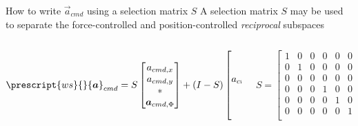\begin{frame}{How to write $\vec{a}_{cmd}$ using a selection matrix $S$}
  A selection matrix $S$ \alert{may} be used to separate the force-controlled 
  and position-controlled \emph{reciprocal} subspaces
  \begin{columns}
    \begin{column}{0.6\textwidth}
      \[  
      \prescript{ws}{}{\vec{a}}_{cmd} = S 
        \begin{bmatrix}
          a_{cmd,x} \\
          a_{cmd,y} \\
          * \\
          \vec{a}_{cmd,\Phi}
        \end{bmatrix} + (I - S) 
        \begin{bmatrix}        
          * \\ * \\ a_{cmd,z} \\ * \\ * \\ *
        \end{bmatrix}
      \]
    \end{column}
    \begin{column}{0.35\columnwidth}
      \[
      S =
        \begin {bmatrix}
          1 & 0 & 0 & 0 & 0 & 0\\
          0 & 1 & 0 & 0 & 0 & 0\\
          0 & 0 & 0 & 0 & 0 & 0\\
          0 & 0 & 0 & 1 & 0 & 0\\
          0 & 0 & 0 & 0 & 1 & 0\\
          0 & 0 & 0 & 0 & 0 & 1\\
        \end {bmatrix}
      \]
    \end{column}
  \end{columns}
\end{frame}

